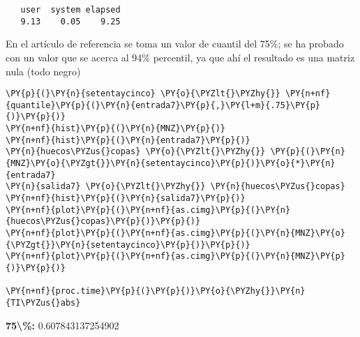     
    \begin{verbatim}
   user  system elapsed 
   9.13    0.05    9.25 
    \end{verbatim}

    
    En el artículo de referencia se toma un valor de cuantil del 75\%; se ha
probado con un valor que se acerca al 94\% percentil, ya que ahí el
resultado es una matriz nula (todo negro)

    \begin{tcolorbox}[breakable, size=fbox, boxrule=1pt, pad at break*=1mm,colback=cellbackground, colframe=cellborder]
\begin{Verbatim}[commandchars=\\\{\}]
\PY{p}{(}\PY{n}{setentaycinco} \PY{o}{\PYZlt{}\PYZhy{}} \PY{n+nf}{quantile}\PY{p}{(}\PY{n}{entrada7}\PY{p}{,}\PY{l+m}{.75}\PY{p}{)}\PY{p}{)}
\PY{n+nf}{hist}\PY{p}{(}\PY{n}{MNZ}\PY{p}{)}
\PY{n+nf}{hist}\PY{p}{(}\PY{n}{entrada7}\PY{p}{)}
\PY{n}{huecos\PYZus{}copas} \PY{o}{\PYZlt{}\PYZhy{}} \PY{p}{(}\PY{n}{MNZ}\PY{o}{\PYZgt{}}\PY{n}{setentaycinco}\PY{p}{)}\PY{o}{*}\PY{n}{entrada7}
\PY{n}{salida7} \PY{o}{\PYZlt{}\PYZhy{}} \PY{n}{huecos\PYZus{}copas}
\PY{n+nf}{hist}\PY{p}{(}\PY{n}{salida7}\PY{p}{)}
\PY{n+nf}{plot}\PY{p}{(}\PY{n+nf}{as.cimg}\PY{p}{(}\PY{n}{huecos\PYZus{}copas}\PY{p}{)}\PY{p}{)}
\PY{n+nf}{plot}\PY{p}{(}\PY{n+nf}{as.cimg}\PY{p}{(}\PY{n}{MNZ}\PY{o}{\PYZgt{}}\PY{n}{setentaycinco}\PY{p}{)}\PY{p}{)}
\PY{n+nf}{plot}\PY{p}{(}\PY{n+nf}{as.cimg}\PY{p}{(}\PY{n}{MNZ}\PY{p}{)}\PY{p}{)}

\PY{n+nf}{proc.time}\PY{p}{(}\PY{p}{)}\PY{o}{\PYZhy{}}\PY{n}{TI\PYZus{}abs}
\end{Verbatim}
\end{tcolorbox}

    \textbf{75\textbackslash{}\%:} 0.607843137254902

    
    \begin{center}
    \end{center}
    { \hspace*{\fill} \\}
    
    \begin{center}
    \end{center}
    { \hspace*{\fill} \\}
    
